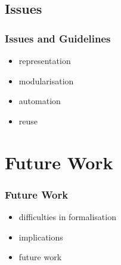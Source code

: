 \documentclass{beamer}
\let\oldframetitle\frametitle
\renewcommand{\frametitle}[1]{
  \oldframetitle{#1}\vspace{-3.5cm}
}
\begin{document}
\subsection{Issues}

\begin{frame}
\frametitle{Issues and Guidelines}
\begin{itemize}
\item representation
\item modularisation
\item automation
\item reuse
\end{itemize}
\end{frame}

\section{Future Work}

\begin{frame}
\oldframetitle{Future Work}
\begin{itemize}
\item difficulties in formalisation
\item implications
\item future work
\end{itemize}
\note{


}
\end{frame}

\printbibliography
\end{document}
